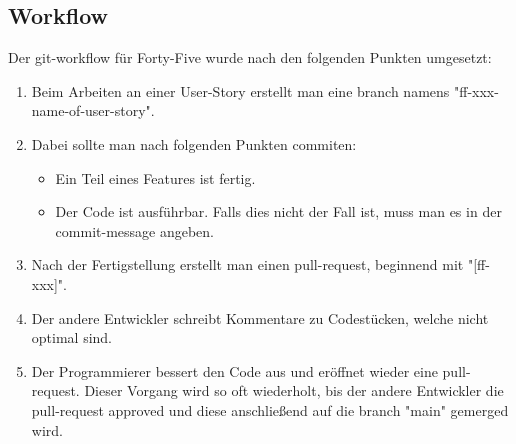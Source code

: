 \renewcommand{\kapitelautor}{Autor: Felix Zwickelstorfer}
\subsection{Workflow}\label{subsec:workflow}

Der git-workflow für Forty-Five wurde nach den folgenden Punkten umgesetzt:
\begin{enumerate}
    \item Beim Arbeiten an einer User-Story erstellt man eine branch namens "ff-xxx-name-of-user-story".
    \item Dabei sollte man nach folgenden Punkten commiten:
    \begin{itemize}
        \item Ein Teil eines Features ist fertig.
        \item Der Code ist ausführbar.
            Falls dies nicht der Fall ist, muss man es in der commit-message angeben.
    \end{itemize}
    \item Nach der Fertigstellung erstellt man einen pull-request, beginnend mit "[ff-xxx]".
    \item Der andere Entwickler schreibt Kommentare zu Codestücken, welche nicht optimal sind.
    \item Der Programmierer bessert den Code aus und eröffnet wieder eine pull-request.
        Dieser Vorgang wird so oft wiederholt, bis der andere Entwickler die pull-request approved und diese anschließend auf die branch "main" gemerged wird.
\end{enumerate}
